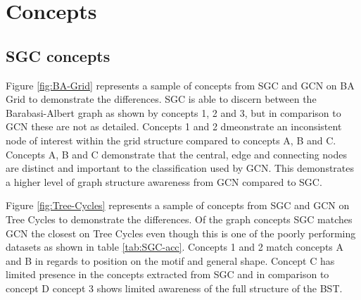 \chapter{Concepts}
\label{app:concepts}

\section{SGC concepts}


Figure \ref{fig:BA-Grid} represents a sample of concepts from SGC and GCN on BA Grid to demonstrate the differences.
SGC is able to discern between the Barabasi-Albert graph as shown by concepts 1, 2 and 3, but in comparison to GCN these are not as detailed.
Concepts 1 and 2 dmeonstrate an inconsistent node of interest within the grid structure compared to concepts A, B and C.
Concepts A, B and C demonstrate that the central, edge and connecting nodes are distinct and important to the classification used by GCN.
This demonstrates a higher level of graph structure awareness from GCN compared to SGC.

Figure \ref{fig:Tree-Cycles} represents a sample of concepts from SGC and GCN on Tree Cycles to demonstrate the differences.
Of the graph concepts SGC matches GCN the closest on Tree Cycles even though this is one of the poorly performing datasets as shown in table \ref{tab:SGC-acc}.
Concepts 1 and 2 match concepts A and B in regards to position on the motif and general shape.
Concept C has limited presence in the concepts extracted from SGC and in comparison to concept D concept 3 shows limited awareness of the full structure of the BST.

